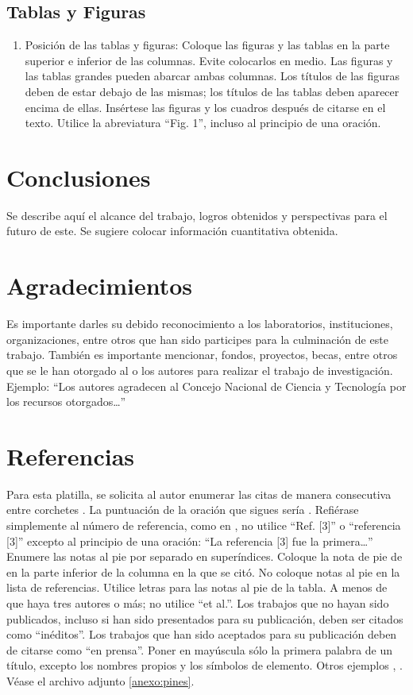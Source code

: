 \subsection{Tablas y Figuras}

\begin{enumerate}
    \item Posición de las tablas y figuras: Coloque las figuras y las tablas en la parte superior e inferior de las columnas. Evite colocarlos en medio. Las figuras y las tablas grandes pueden abarcar ambas columnas. Los títulos de las figuras deben de estar debajo de las mismas; los títulos de las tablas deben aparecer encima de ellas. Insértese las figuras y los cuadros después de citarse en el texto. Utilice la abreviatura “Fig. 1”, incluso al principio de una oración. 
\end{enumerate}

\section{Conclusiones}

Se describe aquí el alcance del trabajo, logros obtenidos y perspectivas para el futuro de este. Se sugiere colocar información cuantitativa obtenida.

\section{Agradecimientos}

Es importante darles su debido reconocimiento a los laboratorios, instituciones, organizaciones, entre otros que han sido participes para la culminación de este trabajo. También es importante mencionar, fondos, proyectos, becas, entre otros que se le han otorgado al o los autores para realizar el trabajo de investigación. Ejemplo: “Los autores agradecen al Concejo Nacional de Ciencia y Tecnología por los recursos otorgados…”

\section*{Referencias}

Para esta platilla, se solicita al autor enumerar las citas de manera consecutiva entre corchetes \cite{YLi2013}. 
La puntuación de la oración que sigues sería \cite{Mesaelides2011}. 
Refiérase simplemente al número de referencia, como en \cite{Morales2012}, no utilice “Ref. [3]” o “referencia [3]” excepto al principio de una oración: “La referencia [3] fue la primera…”
Enumere las notas al pie por separado en superíndices. Coloque la nota de pie de en la parte inferior de la columna en la que se citó. No coloque notas al pie en la lista de referencias. Utilice letras para las notas al pie de la tabla.
A menos de que haya tres autores o más; no utilice “et al.”. Los trabajos que no hayan sido publicados, incluso si han sido presentados para su publicación, deben ser citados como “inéditos”. Los trabajos que han sido aceptados para su publicación deben de citarse como “en prensa”. Poner en mayúscula sólo la primera palabra de un título, excepto los nombres propios y los símbolos de elemento. 
Otros ejemplos \cite{LAAngeles2021}, \cite{LAAngelesConni}. 
Véase el archivo adjunto \ref{anexo:pines}.

